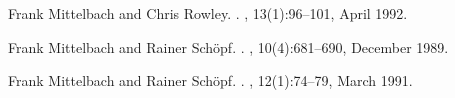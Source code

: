 


\begin{thebibliography}{1}

Frank Mittelbach and Chris Rowley.
.
, 13(1):96--101, April 1992.

Frank Mittelbach and Rainer Sch{\"{o}}pf.
.
, 10(4):681--690, December 1989.

Frank Mittelbach and Rainer Sch{\"{o}}pf.
.
, 12(1):74--79, March 1991.

\end{thebibliography}

\makesignature


